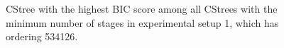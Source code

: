 \documentclass{tufte-book}
\begin{document}
\begin{Definition}
\begin{figure}[]
\begin{floatrow}
   \end{floatrow}
\end{figure}

\begin{figure}[]\label{fig:coronary2}
   \begin{floatrow}
%
\caption{CStree with the highest BIC score among all CStrees with the minimum number of stages in experimental setup 1, which has ordering 534126.}
        
   \end{floatrow}
\end{figure}




\end{Definition}
\end{document}
